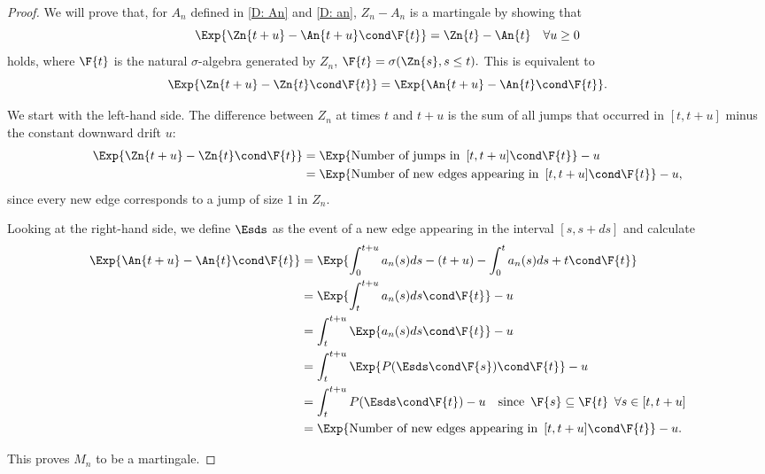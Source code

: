 \begin{proof} \label{P: decomp Zn}
	We will prove that, for $A_n$ defined in \ref{D: An} and \ref{D: an},
	$Z_n - A_n$
	is a martingale by showing that
	\begin{equation} \label{E: Mn martingale}
	\Exp{ \Zn{t+u} - \An{t+u} \cond \F{t} } = \Zn{t} - \An{t} \quad \forall u \geq 0
	\end{equation}
	holds, where $\F{t}$ is the natural $\sigma$-algebra generated by $Z_n$, 
	$\F{t} = \sigma(\Zn{s}, s \leq t).$
	This is equivalent to 
	\begin{equation}
	\Exp{\Zn{t+u} - \Zn{t} \cond \F{t}} = \Exp{\An{t+u} - \An{t} \cond \F{t}}.
	\end{equation}
	
	We start with the left-hand side. 
	The difference between $Z_n$ at times $t$ and $t+u$ is the sum of all jumps that occurred in $[t, t+u]$ minus the constant downward drift $u$:
	\begin{align*}
	\Exp{\Zn{t+u} - \Zn{t} \cond \F{t}} 
	&= \Exp{\text{Number of jumps in} \enspace [t, t+u] \cond \F{t}} - u \\
	&= \Exp{\text{Number of new edges appearing in} \enspace [t, t+u] \cond \F{t}} - u,
	\end{align*}
	since every new edge corresponds to a jump of size $1$ in $Z_n$.
	
	Looking at the right-hand side, we define $\Esds$ as the event of a new edge appearing in the interval $[s,s+ds]$ and calculate
	\begin{align*}
	\Exp{\An{t+u} - \An{t} \cond \F{t}}
	&= \Exp{ \int_{0}^{t+u} a_n(s)ds - (t+u) - \int_{0}^{t} a_n(s)ds + t \cond \F{t} } \\
	&= \Exp{ \int_{t}^{t+u} a_n(s)ds \cond \F{t} } - u \\
	&= \int_{t}^{t+u} \Exp{a_n(s)ds \cond \F{t}} - u \\
	&= \int_{t}^{t+u} \Exp{ P(\Esds \cond \F{s}) \cond \F{t} } - u\\
	&= \int_{t}^{t+u} P( \Esds \cond \F{t} ) - u
	\quad \text{since} \enspace \F{s} \subseteq \F{t} \enspace \forall s \in [t,t+u] \\
	&= \Exp{\text{Number of new edges appearing in} \enspace [t, t+u] \cond \F{t}} - u.
	\end{align*}
	
	This proves $M_n$ to be a martingale. 	
\end{proof}

